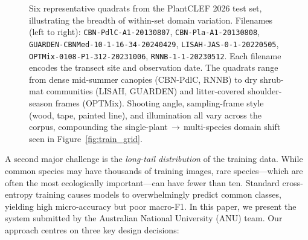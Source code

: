 \documentclass[sigconf]{ceurart}
\begin{document}
\begin{figure}[t]
  \centering
  \resizebox{0.92\linewidth}{!}{}
  \caption{Six representative quadrats from the PlantCLEF 2026 test set, illustrating the breadth of within-set domain variation. Filenames (left to right): \texttt{CBN-PdlC-A1-20130807}, \texttt{CBN-Pla-A1-20130808}, \texttt{GUARDEN-CBNMed-10-1-16-34-20240429}, \texttt{LISAH-JAS-0-1-20220505}, \texttt{OPTMix-0108-P1-312-20231006}, \texttt{RNNB-1-1-20230512}. Each filename encodes the transect site and observation date. The quadrats range from dense mid-summer canopies (CBN-PdlC, RNNB) to dry shrub-mat communities (LISAH, GUARDEN) and litter-covered shoulder-season frames (OPTMix). Shooting angle, sampling-frame style (wood, tape, painted line), and illumination all vary across the corpus, compounding the single-plant\,$\to$\,multi-species domain shift seen in Figure~\ref{fig:train_grid}.}
  \label{fig:quadrats}
\end{figure}
A second major challenge is the \emph{long-tail distribution} of the training data. While common species may have thousands of training images, rare species---which are often the most ecologically important---can have fewer than ten. Standard cross-entropy training causes models to overwhelmingly predict common classes, yielding high micro-accuracy but poor macro-F1.
In this paper, we present the system submitted by the Australian National University (ANU) team. Our approach centres on three key design decisions:
\end{document}
